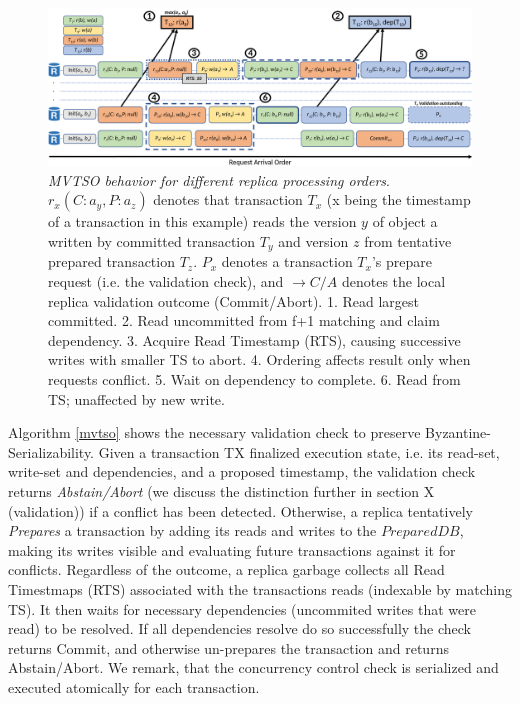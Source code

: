 \begin{figure}
\begin{center}
\includegraphics[width= \textwidth]{./figures/MVTSOLargeFont.png}
\end{center}
\caption{\emph{MVTSO behavior for different replica processing orders}. $r_x(C : a_y ,P : a_z)$ denotes that transaction $T_x$ (x being the timestamp of a transaction in this example) reads the version $y$ of object a written by committed transaction $T_y$ and version $z$ from tentative prepared transaction $T_z$. $P_x$ denotes a transaction $T_x$'s prepare request (i.e. the validation check), and $\rightarrow C / A$ denotes the local replica validation outcome (Commit/Abort). 1. Read largest committed. 2. Read uncommitted from f+1 matching and claim dependency. 3. Acquire Read Timestamp (RTS), causing successive writes with smaller TS to abort.  4. Ordering affects result only when requests conflict. 5. Wait on dependency to complete. 6. Read from TS; unaffected by new write.}
\label{fig:MVTSOEX}
\end{figure}




Algorithm \ref{mvtso} shows the necessary validation check to preserve Byzantine-Serializability. 
Given a transaction TX finalized execution state, i.e. its read-set, write-set and dependencies, and a proposed timestamp, the validation check returns \textit{Abstain/Abort} (we discuss the distinction further in section X (validation)) if a conflict has been detected. Otherwise, a replica tentatively \textit{Prepares} a transaction by adding its reads and writes to the $PreparedDB$, making its writes visible and evaluating future transactions against it for conflicts. Regardless of the outcome, a replica garbage collects all Read Timestmaps (RTS) associated with the transactions reads (indexable by matching TS).
It then waits for necessary dependencies (uncommited writes that were read) to be resolved.  
If all dependencies resolve do so successfully the check returns Commit, and otherwise un-prepares the transaction and returns Abstain/Abort. We remark, that the concurrency control check is serialized and executed atomically for each transaction.


